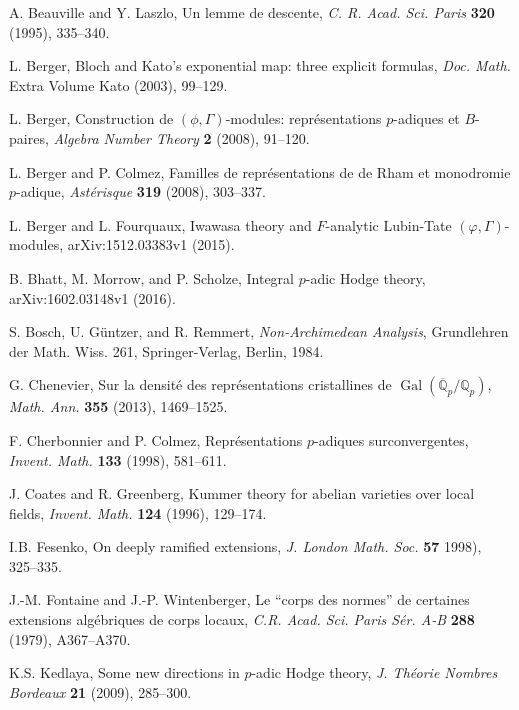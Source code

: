 \documentclass[12pt]{amsart}
\theoremstyle{definition}
\numberwithin{equation}{theorem}
\newcommand{\QQ}{\mathbb{Q}}
\DeclareMathOperator{\Gal}{Gal}
\begin{document}
\begin{thebibliography}{99}

A. Beauville and Y. Laszlo, Un lemme de descente, \textit{C. R. Acad. Sci. Paris} \textbf{320} (1995), 335--340.

L. Berger, Bloch and Kato's exponential map: three explicit formulas,
\textit{Doc. Math.} Extra Volume Kato (2003), 99--129.

L. Berger, Construction de $(\phi, \Gamma)$-modules: repr\'esentations $p$-adiques et $B$-paires, \textit{Algebra Number Theory} \textbf{2} (2008), 91--120.

L. Berger and P. Colmez, Familles de repr\'esentations de de Rham et monodromie $p$-adique, \textit{Ast\'erisque} \textbf{319} (2008), 303--337.

L. Berger and L. Fourquaux, Iwawasa theory and $F$-analytic Lubin-Tate $(\varphi, \Gamma)$-modules, arXiv:1512.03383v1 (2015).

B. Bhatt, M. Morrow, and P. Scholze,
Integral $p$-adic Hodge theory, arXiv:1602.03148v1 (2016).

S. Bosch, U. G\"untzer, and R. Remmert,
\textit{Non-Archimedean Analysis},
Grundlehren der Math. Wiss. 261, Springer-Verlag, Berlin, 1984.

G. Chenevier, Sur la densit\'e des repr\'esentations cristallines de
$\Gal(\overline{\QQ}_p/\QQ_p)$, \textit{Math. Ann.} \textbf{355} (2013), 1469--1525.

F. Cherbonnier and P. Colmez, Repr\'esentations $p$-adiques surconvergentes,
\textit{Invent. Math.} \textbf{133} (1998), 581--611.

J. Coates and R. Greenberg, Kummer theory for abelian varieties over local fields,
\textit{Invent. Math.} \textbf{124} (1996), 129--174.

I.B. Fesenko, On deeply ramified extensions,
\textit{J. London Math. Soc.} \textbf{57} 1998), 325--335.

J.-M. Fontaine and J.-P. Wintenberger,
Le ``corps des normes'' de certaines extensions alg\'ebriques
de corps locaux,
\textit{C.R. Acad. Sci. Paris S\'er. A-B} \textbf{288} (1979), A367--A370.

K.S. Kedlaya, Some new directions in $p$-adic Hodge theory, \textit{J. Th\'eorie Nombres Bordeaux} \textbf{21} (2009), 285--300.


\end{thebibliography}
\end{document}
